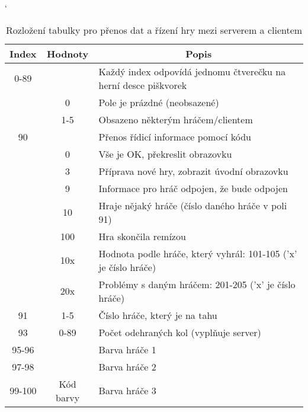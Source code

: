 \begin{table}[hbtp]
\catcode`
\caption{\label{tab:board_content}Rozložení tabulky pro přenos dat a řízení hry mezi serverem a clientem}
\begin{tabular}{|c|c|l|}
\hline
Index   & Hodnoty     & \multicolumn{1}{c|}{Popis}                                      \\ \hline
0-89    &             & Každý index odpovídá jednomu čtverečku na herní desce piškvorek \\ \cline{2-3} 
        & 0           & Pole je prázdné (neobsazené)                                    \\ \cline{2-3} 
        & 1-5         & Obsazeno některým hráčem/clientem                               \\ \hline
90      &             & Přenos řídicí informace pomocí kódu                             \\ \cline{2-3} 
        & 0           & Vše je OK, překreslit obrazovku                                 \\ \cline{2-3} 
        & 3           & Příprava nové hry, zobrazit úvodní obrazovku                    \\ \cline{2-3} 
        & 9           & Informace pro hráč odpojen, že bude odpojen                     \\ \cline{2-3} 
        & 10          & Hraje nějaký hráče (číslo daného hráče v poli 91)               \\ \cline{2-3} 
        & 100         & Hra skončila remízou                                            \\ \cline{2-3} 
        & 10x         & Hodnota podle hráče, který vyhrál: 101-105 ('x' je číslo hráče) \\ \cline{2-3} 
        & 20x         & Problémy s daným hráčem: 201-205 ('x' je číslo hráče)           \\ \hline
91      & 1-5         & Číslo hráče, který je na tahu                                   \\ \hline
93      & 0-89        & Počet odehraných kol (vyplňuje server)                          \\ \hline
95-96   &             & Barva hráče 1                                                   \\ \cline{1-1} \cline{3-3} 
97-98   &             & Barva hráče 2                                                   \\ \cline{1-1} \cline{3-3} 
99-100  & Kód barvy   & Barva hráče 3                                                   \\ \cline{1-1} \cline{3-3} 

\end{tabular}
\end{table}
